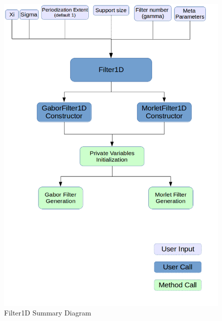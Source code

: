 \documentclass[a4paper]{report}
\begin{document}
\begin{figure}[H]
\begin{center}
\includegraphics[scale=0.31]{filter_diagram.png}\caption{Filter1D Summary Diagram}
\end{center}
\end{figure}
\end{document}
